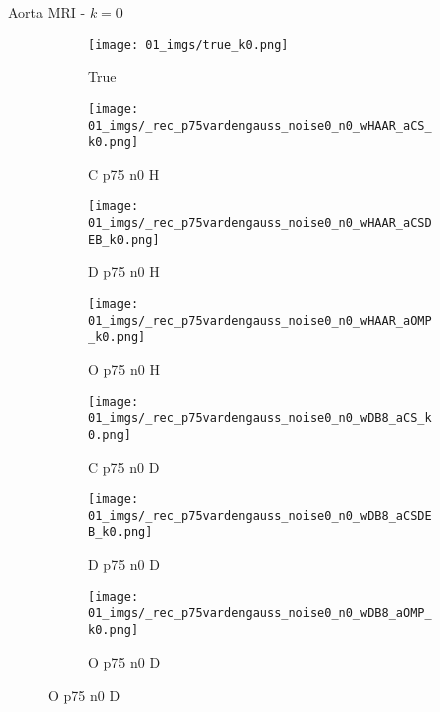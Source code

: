 \begin{frame}{Aorta MRI - $k=0$}{}
\begin{figure}
\begin{subfigure}{0.13\textwidth}
\texttt{[image: 01\_imgs/true\_k0.png]}
\caption*{\tiny True}
\end{subfigure}
\begin{subfigure}{0.13\textwidth}
\texttt{[image: 01\_imgs/\_rec\_p75vardengauss\_noise0\_n0\_wHAAR\_aCS\_k0.png]}
\caption*{\tiny C p75 n0 H}
\end{subfigure}
\begin{subfigure}{0.13\textwidth}
\texttt{[image: 01\_imgs/\_rec\_p75vardengauss\_noise0\_n0\_wHAAR\_aCSDEB\_k0.png]}
\caption*{\tiny D p75 n0 H}
\end{subfigure}
\begin{subfigure}{0.13\textwidth}
\texttt{[image: 01\_imgs/\_rec\_p75vardengauss\_noise0\_n0\_wHAAR\_aOMP\_k0.png]}
\caption*{\tiny O p75 n0 H}
\end{subfigure}
\begin{subfigure}{0.13\textwidth}
\texttt{[image: 01\_imgs/\_rec\_p75vardengauss\_noise0\_n0\_wDB8\_aCS\_k0.png]}
\caption*{\tiny C p75 n0 D}
\end{subfigure}
\begin{subfigure}{0.13\textwidth}
\texttt{[image: 01\_imgs/\_rec\_p75vardengauss\_noise0\_n0\_wDB8\_aCSDEB\_k0.png]}
\caption*{\tiny D p75 n0 D}
\end{subfigure}
\begin{subfigure}{0.13\textwidth}
\texttt{[image: 01\_imgs/\_rec\_p75vardengauss\_noise0\_n0\_wDB8\_aOMP\_k0.png]}
\caption*{\tiny O p75 n0 D}
\end{subfigure}
\end{figure}
\end{frame}


